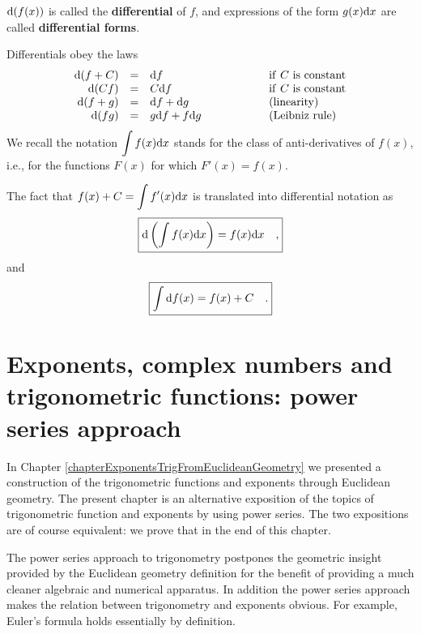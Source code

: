 \documentclass[12pt]{book}
\renewcommand{\emph}{\textbf}
\begin{document}
${\normalfont \text{d}} (f(x))$ is called the \emph{differential} of $f$, and expressions of the form $g(x){\normalfont \text{d}} x$ are called \emph{differential forms}.

Differentials obey the laws
\[
\begin{array}{rcll}
{\normalfont \text{d}} (f+C)&=&{\normalfont \text{d}} f \quad \quad &\mathrm{if~} C \mathrm{~is~constant}\\
{\normalfont \text{d}} (Cf)&=&C{\normalfont \text{d}} f \quad \quad &\mathrm{if~} C \mathrm{~is~constant}\\
{\normalfont \text{d}} (f+g)&=&{\normalfont \text{d}} f+{\normalfont \text{d}} g \quad\quad\quad\quad \quad &(\mathrm{linearity})\\
{\normalfont \text{d}} (fg)&=&g{\normalfont \text{d}} f+f{\normalfont \text{d}} g \quad\quad\quad\quad \quad &(\mathrm{Leibniz~rule})\\
\end{array}
\]
We recall the notation $\displaystyle \int f(x){\normalfont \text{d}} x$ stands for the class of anti-derivatives of $f(x)$, i.e., for the functions $F(x)$ for which $F'(x) = f(x)$.

The fact that $f(x)+C=\displaystyle \int f'(x){\normalfont \text{d}} x$ is translated into differential notation as
\begin{equation}\boxed{
\displaystyle {\normalfont \text{d}} \left(\int f(x){\normalfont \text{d}} x\right)= f(x){\normalfont \text{d}} x\quad ,
}
\end{equation}
and
\begin{equation}\boxed{
\int {\normalfont \text{d}} f(x)= f(x)+C\quad .
}
\end{equation}




\chapter{Exponents, complex numbers and trigonometric functions: power series approach} \label{chapterExponentsTrigFromPowerSeries}
In Chapter \ref{chapterExponentsTrigFromEuclideanGeometry} we presented a construction of the trigonometric functions and exponents through Euclidean geometry. The present chapter is an alternative exposition of the topics of trigonometric function and exponents by using power series. The two expositions are of course equivalent: we prove that in the end of this chapter.


The power series approach to trigonometry postpones the geometric insight provided by the Euclidean geometry definition for the benefit of providing a much cleaner algebraic and numerical apparatus. In addition the power series approach makes the relation between trigonometry and exponents obvious. For example, Euler's formula holds essentially by definition.
\end{document}
